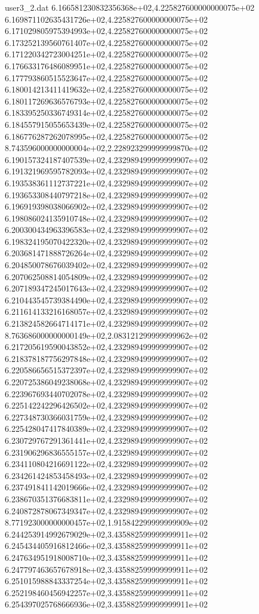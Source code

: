 \begin{filecontents}{user3_2.dat}
6.166581230832356368e+02,4.225827600000000075e+02
6.169871102635431726e+02,4.225827600000000075e+02
6.171029805975394993e+02,4.225827600000000075e+02
6.173252139560761407e+02,4.225827600000000075e+02
6.171220342723004251e+02,4.225827600000000075e+02
6.176633176486089951e+02,4.225827600000000075e+02
6.177793860515523647e+02,4.225827600000000075e+02
6.180014213411419632e+02,4.225827600000000075e+02
6.180117269636576793e+02,4.225827600000000075e+02
6.183395250336749314e+02,4.225827600000000075e+02
6.184557915055653439e+02,4.225827600000000075e+02
6.186776287262078995e+02,4.225827600000000075e+02
8.743596000000000004e+02,2.228923299999999870e+02
6.190157324187407539e+02,4.232989499999999907e+02
6.191321969595782093e+02,4.232989499999999907e+02
6.193538361112737221e+02,4.232989499999999907e+02
6.193653308440797218e+02,4.232989499999999907e+02
6.196919398038066902e+02,4.232989499999999907e+02
6.198086024135910748e+02,4.232989499999999907e+02
6.200300434963396583e+02,4.232989499999999907e+02
6.198324195070422320e+02,4.232989499999999907e+02
6.203681471888726264e+02,4.232989499999999907e+02
6.204850078676039402e+02,4.232989499999999907e+02
6.207062508814054809e+02,4.232989499999999907e+02
6.207189347245017643e+02,4.232989499999999907e+02
6.210443545739384490e+02,4.232989499999999907e+02
6.211614133216168057e+02,4.232989499999999907e+02
6.213824582664714171e+02,4.232989499999999907e+02
8.763686000000000149e+02,2.083121299999999962e+02
6.217205619590043852e+02,4.232989499999999907e+02
6.218378187756297848e+02,4.232989499999999907e+02
6.220586656515372397e+02,4.232989499999999907e+02
6.220725386049238068e+02,4.232989499999999907e+02
6.223967693440702078e+02,4.232989499999999907e+02
6.225142242296426502e+02,4.232989499999999907e+02
6.227348730366031759e+02,4.232989499999999907e+02
6.225428047417840389e+02,4.232989499999999907e+02
6.230729767291361441e+02,4.232989499999999907e+02
6.231906296836555157e+02,4.232989499999999907e+02
6.234110804216691122e+02,4.232989499999999907e+02
6.234261424853458493e+02,4.232989499999999907e+02
6.237491841142019666e+02,4.232989499999999907e+02
6.238670351376683811e+02,4.232989499999999907e+02
6.240872878067349347e+02,4.232989499999999907e+02
8.771923000000000457e+02,1.915842299999999909e+02
6.244253914992679029e+02,3.435882599999999911e+02
6.245434405916812466e+02,3.435882599999999911e+02
6.247634951918008710e+02,3.435882599999999911e+02
6.247797463657678918e+02,3.435882599999999911e+02
6.251015988843337254e+02,3.435882599999999911e+02
6.252198460456942257e+02,3.435882599999999911e+02
6.254397025768666936e+02,3.435882599999999911e+02

\end{filecontents}
